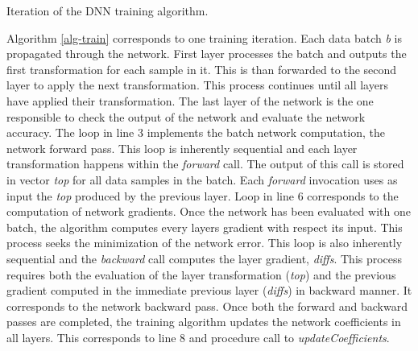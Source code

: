 \setlength{\textfloatsep}{2pt}%
\begin{algorithm}
\small
\caption{Iteration of the DNN training algorithm.}
\label{alg-train}
\BlankLine
\For{$b\leftarrow 1$ \KwTo $B$}{
\BlankLine
    top[1]=layers(1)$\rightarrow$ forward(batches[b]);
\BlankLine
    \For{$l\leftarrow 2$ \KwTo $L$}{
      top[l]=layers(l)$\rightarrow$ forward(top[l-1]);
    }
\BlankLine
    diffs[1]=layers(L)$\rightarrow$ backward(top[L]);
\BlankLine
    \For{$l\leftarrow L-1$ \KwTo $1$}{
      diffs[l]=layers(l)$\rightarrow$ backward(top[l],diffs[l+1]);
    }
updateCoefficients(layers, top, diffs);
  }
\end{algorithm}

Algorithm \ref{alg-train} corresponds to one training iteration. 
Each data batch \emph{b} is propagated through the network. 
First layer processes the batch and outputs the first transformation 
for each sample in it. This is than forwarded to the 
second layer to apply the next transformation. This process continues 
until all layers have applied their transformation. The last layer 
of the network is the one responsible to check the output of the 
network and evaluate the network accuracy. The loop in line 3 implements 
the batch network computation, the network forward pass.
This loop is inherently sequential and each layer 
transformation happens within the \emph{forward} call. The output of 
this call is stored in vector \emph{top} for all data samples in the 
batch. Each \emph{forward} invocation uses as input the \emph{top} 
produced by the previous layer. Loop in line 6 corresponds to the 
computation of network gradients. Once the network has been evaluated 
with one batch, the algorithm computes every layers gradient 
with respect its input. This process seeks the minimization 
of the network error. This loop is also inherently sequential and 
the \emph{backward} call computes the layer gradient, \emph{diffs}. 
This process requires both the evaluation of the layer transformation 
(\emph{top}) and the previous gradient computed in the immediate previous 
layer (\emph{diffs}) in backward manner. It corresponds to the network 
backward pass. Once both the forward and backward passes are completed, 
the training algorithm updates the network coefficients in all layers. 
This corresponds to line 8 and procedure call to \emph{updateCoefficients}.

